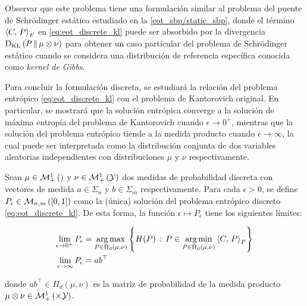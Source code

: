 Observar que este problema tiene una formulación similar al problema del puente de Schrödinger estático estudiado en la \autoref{eot_sbp/static_sbp}, donde el término $\left\langle C,\,P\right\rangle_F$ en \eqref{eq:eot_discrete_kl} puede ser absorbido por la divergencia $\operatorname{D_{KL}}\left(P\,\|\,\mu\otimes\nu\right)$ para obtener un caso particular del problema de Schrödinger estático cuando se considera una distribución de referencia específica conocida como \textit{kernel de Gibbs}.

Para concluir la formulación discreta, se estudiará la relación del problema entrópico \eqref{eq:eot_discrete_kl} con el problema de Kantorovich original. En particular, se mostrará que la solución entrópica converge a la solución de máxima entropía del problema de Kantorovich cuando $\epsilon\to 0^+$, mientras que la solución del problema entrópico tiende a la medida producto cuando $\epsilon\to\infty$, la cual puede ser interpretada como la distribución conjunta de dos variables aleatorias independientes con distribuciones $\mu$ y $\nu$ respectivamente.

\begin{prop}
	\label{prop:eot_convergence}
	Sean $\mu\in\mathcal{M}_+^1\left(\right)$ y $\nu\in\mathcal{M}_+^1\left(\mathcal{Y}\right)$ dos medidas de probabilidad discreta con vectores de medida $a\in\Sigma_n$ y $b\in\Sigma_m$ respectivamente. Para cada $\epsilon>0$, se define $P_\epsilon\in\mathcal{M}_{n,m}\left([0,1]\right)$ como la (única) solución del problema entrópico discreto \eqref{eq:eot_discrete_kl}. De esta forma, la función $\epsilon\mapsto P_\epsilon$ tiene los siguientes límites:

	\begin{align*}
		\lim_{\epsilon\to 0^+} P_\epsilon    & = \operatorname*{arg\,max}_{P\in\Pi_d(\mu,\nu)} \left\{H(P)\,:\, P\in  \operatorname*{arg\,min}_{P\in\Pi_d(\mu,\nu)} \left\langle C,\,P\right\rangle_F   \right\} \\
		\lim_{\epsilon\to \infty} P_\epsilon & = ab^\top
	\end{align*}

	donde $ab^\top\in\Pi_d(\mu,\nu)$ es la matriz de probabilidad de la medida producto $\mu\otimes\nu\in\probmeasure{\xspace\times\yspace}$.
\end{prop}

